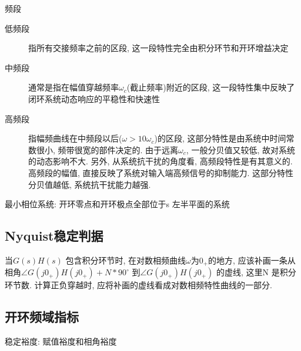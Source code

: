 \documentclass[openany]{book}
\begin{document}
频段
\begin{description}
	\item[低频段] 指所有交接频率之前的区段, 这一段特性完全由积分环节和开环增益决定
	\item[中频段] 通常是指在幅值穿越频率$\omega_c$(截止频率)附近的区段, 这一段特性集中反映了闭环系统动态响应的平稳性和快速性
	\item[高频段] 指幅频曲线在中频段以后($\omega > 10\omega_c$)的区段, 这部分特性是由系统中时间常数很小, 频带很宽的部件决定的. 由于远离$\omega_c$, 一般分贝值又较低, 故对系统的动态影响不大. 另外, 从系统抗干扰的角度看, 高频段特性是有其意义的. 高频段的幅值, 直接反映了系统对输入端高频信号的抑制能力. 这部分特性分贝值越低, 系统抗干扰能力越强.
\end{description}

最小相位系统: 开环零点和开环极点全部位于s 左半平面的系统
\subsection{Nyquist稳定判据}
当$G(s)H(s)$ 包含积分环节时, 在对数相频曲线$\omega$为$0_+$的地方, 应该补画一条从相角$\angle G(j0_+)H(j0_+)+N*90^\circ$ 到$\angle G(j0_+)H(j0_+)$
的虚线, 这里N 是积分环节数.\newline
计算正负穿越时, 应将补画的虚线看成对数相频特性曲线的一部分.

\subsection{开环频域指标}
稳定裕度: 赋值裕度和相角裕度
\end{document}
